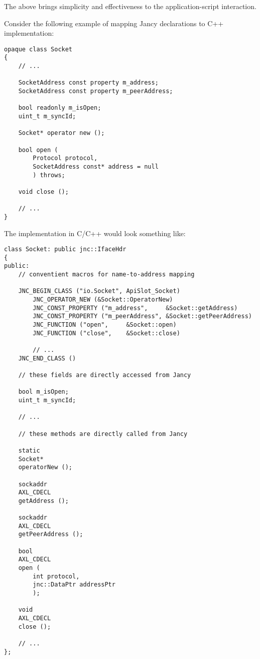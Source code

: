 \documentclass[oneside]{book}
\begin{document}
The above brings simplicity and effectiveness to the application-script interaction.

Consider the following example of mapping Jancy declarations to C++ implementation:

\begin{lstlisting}
opaque class Socket
{
    // ...

    SocketAddress const property m_address;
    SocketAddress const property m_peerAddress;

    bool readonly m_isOpen;
    uint_t m_syncId;

    Socket* operator new ();

    bool open (
        Protocol protocol,
        SocketAddress const* address = null
        ) throws;

    void close ();

    // ...
}
\end{lstlisting}

The implementation in C/C++ would look something like:

\begin{lstlisting}
class Socket: public jnc::IfaceHdr
{
public:
    // conventient macros for name-to-address mapping

    JNC_BEGIN_CLASS ("io.Socket", ApiSlot_Socket)
        JNC_OPERATOR_NEW (&Socket::OperatorNew)
        JNC_CONST_PROPERTY ("m_address",     &Socket::getAddress)
        JNC_CONST_PROPERTY ("m_peerAddress", &Socket::getPeerAddress)
        JNC_FUNCTION ("open",     &Socket::open)
        JNC_FUNCTION ("close",    &Socket::close)

        // ...
    JNC_END_CLASS ()

    // these fields are directly accessed from Jancy

    bool m_isOpen;
    uint_t m_syncId;

    // ...

    // these methods are directly called from Jancy

    static
    Socket*
    operatorNew ();

    sockaddr
    AXL_CDECL
    getAddress ();

    sockaddr
    AXL_CDECL
    getPeerAddress ();

    bool
    AXL_CDECL
    open (
        int protocol,
        jnc::DataPtr addressPtr
        );

    void
    AXL_CDECL
    close ();

    // ...
};
\end{lstlisting}
\end{document}
